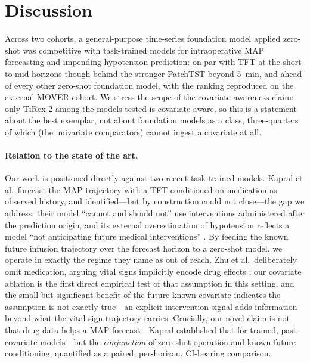 \documentclass[11pt]{article}
\begin{document}
\section{Discussion}

Across two cohorts, a general-purpose time-series foundation model applied
zero-shot was competitive with task-trained models for intraoperative MAP
forecasting and impending-hypotension prediction: on par with TFT at the
short-to-mid horizons though behind the stronger PatchTST beyond 5~min, and
ahead of every other zero-shot foundation model, with the ranking reproduced
on the external MOVER cohort. We stress the scope of the covariate-awareness
claim: only TiRex-2 among the models tested is covariate-aware, so this is a
statement about the best exemplar, not about foundation models as a class,
three-quarters of which (the univariate comparators) cannot ingest a
covariate at all.

\paragraph{Relation to the state of the art.} Our work is positioned
directly against two recent task-trained models. Kapral et al.\ forecast the
MAP trajectory with a TFT conditioned on medication as observed history, and
identified---but by construction could not close---the gap we address: their
model ``cannot and should not'' use interventions administered after the
prediction origin, and its external overestimation of hypotension reflects a
model ``not anticipating future medical interventions'' \citep{Kapral2024}.
By feeding the known future infusion trajectory over the forecast horizon to
a zero-shot model, we operate in exactly the regime they name as out of
reach. Zhu et al.\ deliberately omit medication, arguing vital signs
implicitly encode drug effects \citep{Zhu2026}; our covariate ablation is
the first direct empirical test of that assumption in this setting, and the
small-but-significant benefit of the future-known covariate indicates the
assumption is not exactly true---an explicit intervention signal adds
information beyond what the vital-sign trajectory carries. Crucially, our
novel claim is not that drug data helps a MAP forecast---Kapral established
that for trained, past-covariate models---but the \emph{conjunction} of
zero-shot operation and known-future conditioning, quantified as a paired,
per-horizon, CI-bearing comparison.
\end{document}
